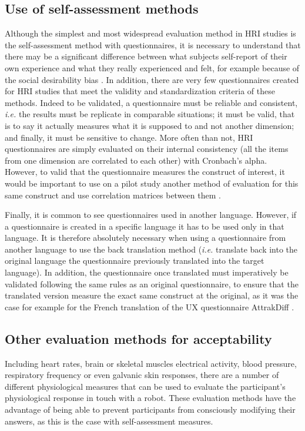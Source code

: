 \documentclass[a4paper,11pt,twoside]{StyleThese}
\begin{document}
\subsection{Use of self-assessment methods}

Although the simplest and most widespread evaluation method in HRI studies is the self-assessment method with questionnaires, it is necessary to understand that there may be a significant difference between what subjects self-report of their own experience and what they really experienced and felt, for example because of the social desirability bias \cite{fisher1993social}. In addition, there are very few questionnaires created for HRI studies that meet the validity and standardization criteria of these methods. Indeed to be validated, a questionnaire must be reliable and consistent, \textit{i.e.} the results must be replicate in comparable situations; it must be valid, that is to say it actually measures what it is supposed to and not another dimension; and finally, it must be sensitive to change. More often than not, HRI questionnaires are simply evaluated on their internal consistency (all the items from one dimension are correlated to each other) with Cronbach's alpha. However, to valid that the questionnaire measures the construct of interest, it would be important to use on a pilot study another method of evaluation for this same construct and use correlation matrices between them \cite{tsang2017guidelines}. 

Finally, it is common to see questionnaires used in another language. However, if a questionnaire is created in a specific language it has to be used only in that language. It is therefore absolutely necessary when using a questionnaire from another language to use the back translation method (\textit{i.e.} translate back into the original language the questionnaire previously translated into the target language). In addition, the questionnaire once translated must imperatively be validated following the same rules as an original questionnaire, to ensure that the translated version measure the exact same construct at the original, as it was the case for example for the French translation of the UX questionnaire AttrakDiff \cite{lallemand_creation_2015}.

\subsection{Other evaluation methods for acceptability}

Including heart rates, brain or skeletal muscles electrical activity, blood pressure, respiratory frequency or even galvanic skin responses, there are a number of different physiological measures that can be used to evaluate the participant's physiological response in touch with a robot. These evaluation methods have the advantage of being able to prevent participants from consciously modifying their answers, as this is the case with self-assessment measures.
\end{document}
